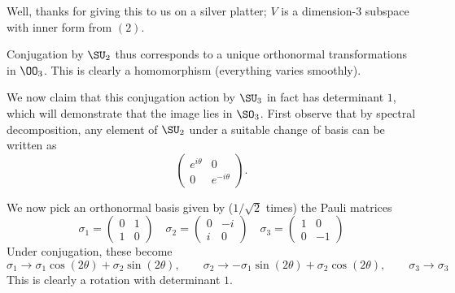 \documentclass[11pt, headheight=30pt]{scrartcl}
\begin{document}
\begin{psec*}
    [Homomorphism]
    Well, thanks for giving this to us on a silver platter;
    $V$ is a dimension-3 subspace with inner form from $(2)$.

    Conjugation by $\SU_2$ thus corresponds 
    to a unique orthonormal transformations in $\OO_3$.
    This is clearly a homomorphism (everything varies smoothly).
    
    We now claim that this conjugation action by $\SU_3$
    in fact has determinant $1$, which will demonstrate
    that the image lies in $\SO_3$. First observe that by spectral decomposition,
    any element of $\SU_2$ under a suitable change of basis
    can be written as
    \[
        \begin{pmatrix}
            e^{i\theta} & 0\\
            0 & e^{-i\theta}
        \end{pmatrix}.
    \]

    We now pick an orthonormal basis given by ($1/\sqrt{2}$ times)
    the Pauli matrices
    \[
        \sigma_1 = \begin{pmatrix}
            0 & 1 \\ 1 & 0
        \end{pmatrix}
        \quad
        \sigma_2 = \begin{pmatrix}
            0 & -i \\ i & 0
        \end{pmatrix}
        \quad
        \sigma_3 = \begin{pmatrix}
            1 & 0 \\ 0 & -1
        \end{pmatrix}
    \]
    Under conjugation, these become
    \[
        \sigma_1 \to \sigma_1\cos(2\theta) + \sigma_2 \sin(2\theta),\qquad
        \sigma_2 \to -\sigma_1\sin(2\theta) + \sigma_2 \cos(2\theta),\qquad
        \sigma_3 \to \sigma_3
    \]
    This is clearly a rotation with determinant $1$.

\end{psec*}
\end{document}
